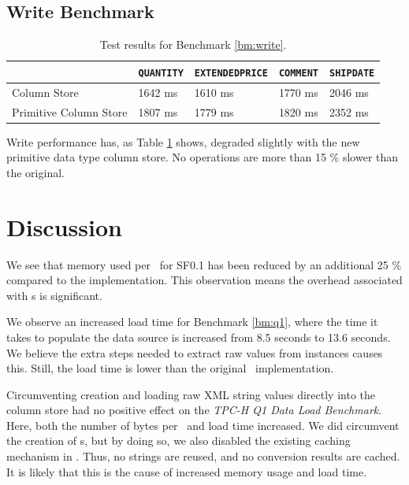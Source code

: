 \subsection{Write Benchmark}
\label{sub:Write Benchmark}
\begin{table}
    \begin{tabularx}{\textwidth}{X | X X X X}
         & \texttt{QUANTITY} & \texttt{EXTENDEDPRICE} & \texttt{COMMENT} & \texttt{SHIPDATE}\\ 
        \hline
        \hline
        Column Store & 1642 ms & 1610 ms & 1770 ms & 2046 ms \\
        Primitive Column Store & 1807 ms & 1779 ms & 1820 ms & 2352 ms \\
    \end{tabularx}
    \caption{Test results for Benchmark \ref{bm:write}.}
    \label{tab:primitive-write}
\end{table}
Write performance has, as Table \ref{tab:primitive-write} shows, degraded slightly with the new primitive data type column store. No operations are more than 15 \% slower than the original.

\section{Discussion}
\label{sec:part2-discussion}

We see that memory used per \lineitem~for SF0.1 has been reduced by an additional 25 \% compared to the  implementation. This observation means the overhead associated with s is significant.

We observe an increased load time for Benchmark \ref{bm:q1}, where the time it takes to populate the data source is increased from 8.5 seconds to 13.6 seconds. We believe the extra steps needed to extract raw values from  instances causes this. Still, the load time is lower than the original \gap~implementation.

Circumventing  creation and loading raw XML string values directly into the column store had no positive effect on the \textit{TPC-H Q1 Data Load Benchmark}. Here, both the number of bytes per \lineitem~and load time increased. We did circumvent the creation of s, but by doing so, we also disabled the existing caching mechanism in \gap. Thus, no strings are reused, and no conversion results are cached. It is likely that this is the cause of increased memory usage and load time.

